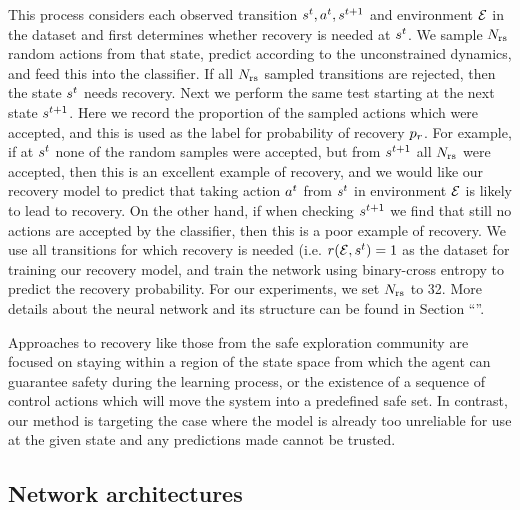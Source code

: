 This process considers each observed transition $s^{t},a^{t},s^{t+1}$ and environment $\mathcal{E}$ in the dataset and first determines whether recovery is needed at $s^{t}$. We sample $N_\text{rs}$ random actions from that state, predict according to the unconstrained dynamics, and feed this into the classifier. If all $N_\text{rs}$ sampled transitions are rejected, then the state $s^{t}$ needs recovery. Next we perform the same test starting at the next state $s^{t+1}$. Here we record the proportion of the sampled actions which were accepted, and this is used as the label for probability of recovery $p_r$. For example, if at $s^{t}$ none of the random samples were accepted, but from $s^{t+1}$ all $N_\text{rs}$ were accepted, then this is an excellent example of recovery, and we would like our recovery model to predict that taking action $a^{t}$ from $s^{t}$ in environment $\mathcal{E}$ is likely to lead to recovery. On the other hand, if when checking $s^{t+1}$ we find that still no actions are accepted by the classifier, then this is a poor example of recovery. We use all transitions for which recovery is needed (i.e. $r(\mathcal{E},s^{t}) = 1$ as the dataset for training our recovery model, and train the network using binary-cross entropy to predict the recovery probability. For our experiments, we set $N_\text{rs}$ to 32. More details about the neural network and its structure can be found in Section ``''.

Approaches to recovery like those from the safe exploration community \cite{Koller2018,Berkenkamp2017,Fisac2019safety} are focused on staying within a region of the state space from which the agent can guarantee safety during the learning process, or the existence of a sequence of control actions which will move the system into a predefined safe set. In contrast, our method is targeting the case where the model is already too unreliable for use at the given state and any predictions made cannot be trusted.

\subsection{Network architectures}
\label{Scirob:sec:architectures}

